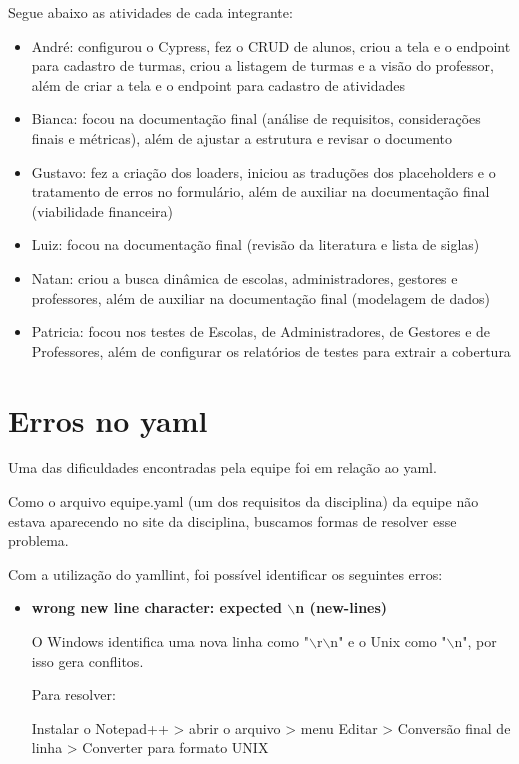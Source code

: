 \begin{apendicesenv}
Segue abaixo as atividades de cada integrante:
\begin{itemize}
\item André: configurou o Cypress, fez o CRUD de alunos, criou a tela e o endpoint para cadastro de turmas, criou a listagem de turmas e a visão do professor, além de criar a tela e o endpoint para cadastro de atividades
\item Bianca: focou na documentação final (análise de requisitos, considerações finais e métricas), além de ajustar a estrutura e revisar o documento 
\item Gustavo: fez a criação dos loaders, iniciou as traduções dos placeholders e o tratamento de erros no formulário, além de auxiliar na documentação final (viabilidade financeira)
\item Luiz: focou na documentação final (revisão da literatura e lista de siglas)
\item Natan: criou a busca dinâmica de escolas, administradores, gestores e professores, além de auxiliar na documentação final (modelagem de dados)
\item Patricia: focou nos testes de Escolas, de Administradores, de Gestores e de Professores, além de configurar os relatórios de testes para extrair a cobertura
\end{itemize}

\section{Erros no yaml}
Uma das dificuldades encontradas pela equipe foi em relação ao yaml. 

Como o arquivo equipe.yaml (um dos requisitos da disciplina) da equipe não estava aparecendo no site da disciplina, buscamos formas de resolver esse problema.

Com a utilização do yamllint, foi possível identificar os seguintes erros:

\begin{itemize}
\item \textbf{wrong new line character: expected $\backslash$n  (new-lines)}

O Windows identifica uma nova linha como "$\backslash$r$\backslash$n" e o Unix como "$\backslash$n", por isso gera conflitos.

Para resolver:

Instalar o Notepad++   >    abrir o arquivo  >   menu Editar   >   Conversão final de linha   >   Converter para formato UNIX



\end{itemize}
\end{apendicesenv}
